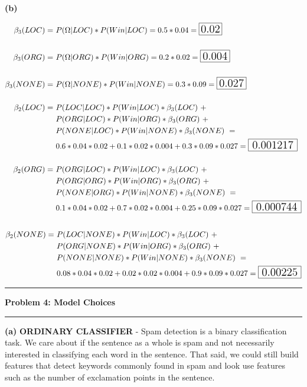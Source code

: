 \documentclass[11pt]{article}
\newcommand\question[2]{\vspace{.25in}\hrule\textbf{#1: #2}\vspace{.5em}\hrule\vspace{.10in}}
\renewcommand\part[1]{\vspace{.10in}\textbf{(#1)}}
\begin{document}
\part{b}

\begin{align*}
\beta_3(LOC) =  &\ P(\Omega | LOC) * P(Win | LOC) = 0.5 * 0.04 = \framebox[1.2\width]{\Large{0.02}} \\ \\
\beta_3(ORG) =  &\ P(\Omega | ORG) * P(Win | ORG) = 0.2 * 0.02 = \framebox[1.2\width]{\Large{0.004}} \\ \\
\beta_3(NONE) = &\ P(\Omega | NONE) * P(Win | NONE) = 0.3 * 0.09 = \framebox[1.2\width]{\Large{0.027}} \\ \\
\beta_2(LOC) = &\ P(LOC | LOC) * P(Win | LOC) * \beta_3(LOC) \ + \\
&\ P(ORG | LOC) * P(Win | ORG) * \beta_3(ORG) \ + \\
&\ P(NONE | LOC) * P(Win | NONE) * \beta_3(NONE) \ = \\
&\ 0.6 * 0.04 * 0.02 + 0.1 * 0.02 * 0.004 + 0.3 * 0.09 * 0.027 = \framebox[1.2\width]{\Large{0.001217}}\\ \\
\beta_2(ORG) = &\ P(ORG | LOC) * P(Win | LOC) * \beta_3(LOC) \ + \\
&\ P(ORG | ORG) * P(Win | ORG) * \beta_3(ORG) \ + \\
&\ P(NONE | ORG) * P(Win | NONE) * \beta_3(NONE) \ = \\
&\ 0.1 * 0.04 * 0.02 + 0.7 * 0.02 * 0.004 + 0.25 * 0.09 * 0.027 = \framebox[1.2\width]{\Large{0.000744}}\\ \\
\end{align*}
\begin{align*}
\beta_2(NONE) = &\ P(LOC | NONE) * P(Win | LOC) * \beta_3(LOC) \ + \\
&\ P(ORG | NONE) * P(Win | ORG) * \beta_3(ORG) \ + \\
&\ P(NONE | NONE) * P(Win | NONE) * \beta_3(NONE) \ = \\
&\ 0.08 * 0.04 * 0.02 + 0.02 * 0.02 * 0.004 + 0.9 * 0.09 * 0.027 = \framebox[1.2\width]{\Large{0.00225}}\\
\end{align*}

\question{Problem 4}{Model Choices}

\part{a} \textbf{ORDINARY CLASSIFIER} - Spam detection is a binary classification task. We care about if the sentence as a whole is spam and not necessarily interested in classifying each word in the sentence. That said, we could still build features that detect keywords commonly found in spam and look use features such as the number of exclamation points in the sentence.
\end{document}
